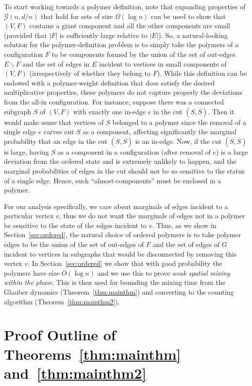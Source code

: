 \documentclass[11pt]{article}
\theoremstyle{plain}
\newcommand{\G}{\mathcal{G}}
\newcommand{\1}{\mathbb{1}}
\begin{document}
To start working towards a polymer definition, note that expanding properties of \(\G(n,d/n)\) that hold for sets of size $\Omega(\log n)$ can be used to show  that \((V,F)\) contains a giant component and all the other components are small (provided that $|F|$ is sufficiently large relative to $|E|$). So, a natural-looking solution for the polymer-definition problem is  to simply take the  polymers of a configuration $F$ to be components formed by the union of the set of out-edges $E\backslash F$ and the set of edges in $E$ incident to vertices in 
small components of $(V,F)$ (irrespectively of whether they belong to $F$). While this definition can be endowed with a polymer-weight definition that does satisfy the desired multiplicative properties, these polymers do not capture properly the deviations from the all-in  configuration. For instance, suppose there was a connected subgraph \(S\) of \((V,F)\) with exactly one in-edge $e$ in the cut \((S,\overline S)\). Then it would make sense that vertices of \(S\) belonged to a polymer since the removal of a single edge $e$ carves out $S$ as a component, affecting significantly  the marginal probability that an edge in the cut $(S,\overline S)$ is an in-edge.
Now, if the cut \((S,\overline S)\) is large, having $S$ as a  
component in a configuration (after removal of $e$) is a large deviation from the ordered state and is extremely unlikely to happen, and the marginal probabilities of edges in the cut should not be so sensitive to the status of a single edge. Hence, such ``almost-components'' must be enclosed in a polymer.

For our analysis specifically, we care about marginals of edges incident to a particular vertex $v$, thus we do not want the marginals of edges not in a polymer be sensitive to the state of the edges incident to $v$.  Thus, as we show in Section~\ref{sec:ordered}, 
the natural choice of ordered polymers   is to take polymer edges to be the union of the set of out-edges of $F$ and the set of edges of $G$ incident to vertices in subgraphs that would be disconnected by removing this vertex $v$. 
In Section~\ref{sec:ordered} we show that with good probability the polymers have size \(O(\log n)\) and we use this to prove \textit{weak spatial mixing within the phase}. This is then used for bounding the mixing time from the Glauber dynamics (Theorem~\ref{thm:mainthm}) and converting to the counting algorithm (Theorem~\ref{thm:mainthm2}).

\section{Proof Outline of Theorems~\ref{thm:mainthm} and~\ref{thm:mainthm2}}\label{sec:proof-walkthrough} 
\end{document}
